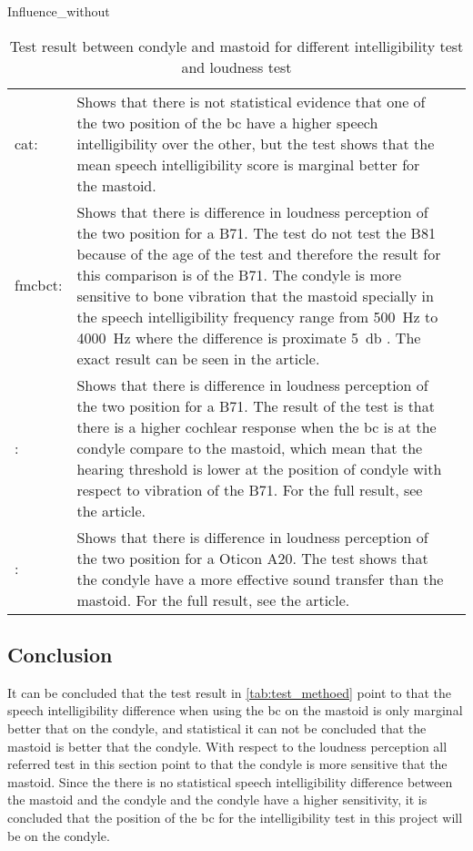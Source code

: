 Influence_without
 
\begin{table}[H]
\caption{Test result between condyle and mastoid for different intelligibility test and loudness test} 
\begin{tabularx}{\textwidth}{l X l}
\hline
\gls{cat}: & Shows that there is not statistical evidence that one of the two position of the \gls{bc} have a higher speech intelligibility over the other, but the test shows that the mean speech intelligibility score is marginal better for the mastoid. \\
\gls{fmcbct}: & Shows that there is difference in loudness perception of the two position for a B71. The test do not test the B81 because of the age of the test and therefore the result for this comparison is of the B71. The condyle is more sensitive to bone vibration that the mastoid specially in the speech intelligibility frequency range from \SI{500}{\hertz} to \SI{4000}{\hertz} where the difference is proximate \SI{5}{\decibel} \citep{freefield_method}. The exact result can be seen in the article. \\
\citep{Influence_without}: & Shows that there is difference in loudness perception of the two position for a B71. The result of the test is that there is a higher cochlear response when the \gls{bc} is at the condyle compare to the mastoid, which mean that the hearing threshold is lower at the position of condyle \citep{Influence_without} with respect to vibration of the B71. For the full result, see the article. \\
\citep{sensitivity_mapping}: & Shows that there is difference in loudness perception of the two position for a Oticon A20. The test shows that the condyle have a more effective sound transfer than the mastoid. For the full result, see the article.  \\ \hline
\end{tabularx}
\label{tab:test_methoed}
\end{table}



\subsection{Conclusion}
It can be concluded that the test result in \autoref{tab:test_methoed} point to that the speech intelligibility difference when using the \gls{bc} on the mastoid is only marginal better that on the condyle, and statistical it can not be concluded that the mastoid is better that the condyle. With respect to the loudness perception all referred test in this section point to that the condyle is more sensitive that the mastoid. Since the there is no statistical speech intelligibility difference between the mastoid and the condyle and the condyle have a higher sensitivity, it is concluded that the position of the \gls{bc} for the intelligibility test in this project will be on the condyle.


